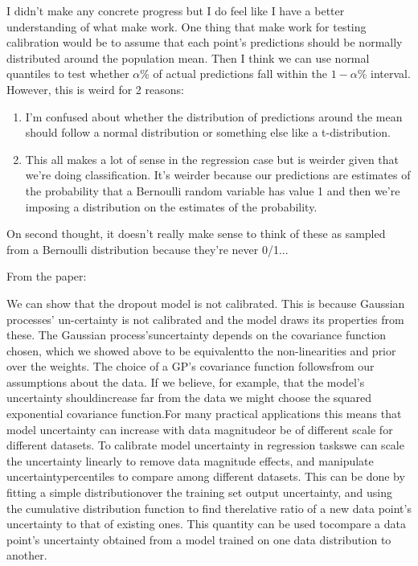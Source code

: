 \begin{Minutes}{}
I didn't make any concrete progress but I do feel like I have a better understanding of what make work. One thing that make work for testing calibration would be to assume that each point's predictions should be normally distributed around the population mean. Then I think we can use normal quantiles to test whether \( \alpha \)\% of actual predictions fall within the \( 1-\alpha \)\% interval. However, this is weird for 2 reasons:
\begin{enumerate}
    \item I'm confused about whether the distribution of predictions around the mean should follow a normal distribution or something else like a t-distribution.
    \item This all makes a lot of sense in the regression case but is weirder given that we're doing classification. It's weirder because our predictions are estimates of the probability that a Bernoulli random variable has value 1 and then we're imposing a distribution on the estimates of the probability. \label{point:weird_thing_2}
\end{enumerate}

On second thought, it doesn't really make sense to think of these as sampled from a Bernoulli distribution because they're never 0/1...

From the paper:
\begin{displayquote}
We can show that the dropout model is not calibrated.   This is because Gaussian processes’ un-certainty is not calibrated and the model draws its properties from these.  The Gaussian process’suncertainty depends on the covariance function chosen, which we showed above to be equivalentto the non-linearities and prior over the weights.  The choice of a GP’s covariance function followsfrom our assumptions about the data. If we believe, for example, that the model’s uncertainty shouldincrease far from the data we might choose the squared exponential covariance function.For many practical applications this means that model uncertainty can increase with data magnitudeor be of different scale for different datasets.   To calibrate model uncertainty in regression taskswe can scale the uncertainty linearly to remove data magnitude effects, and manipulate uncertaintypercentiles to compare among different datasets.  This can be done by fitting a simple distributionover the training set output uncertainty, and using the cumulative distribution function to find therelative ratio of a new data point’s uncertainty to that of existing ones. This quantity can be used tocompare a data point’s uncertainty obtained from a model trained on one data distribution to another.
\end{displayquote}
\end{Minutes}
